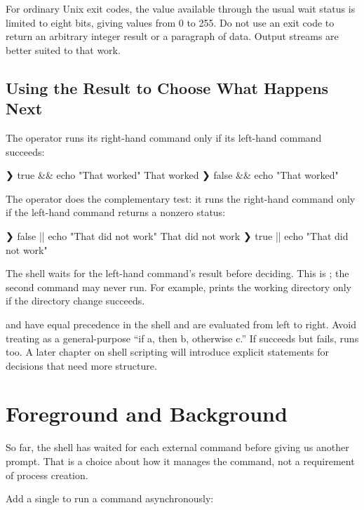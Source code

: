 \documentclass[11pt]{article}
\begin{document}
For ordinary Unix exit codes, the value available through the usual wait status is limited to eight bits, giving values from 0 to 255.
Do not use an exit code to return an arbitrary integer result or a paragraph of data.
Output streams are better suited to that work.

\subsection{Using the Result to Choose What Happens Next}

The \inlinesh{&&} operator runs its right-hand command only if its left-hand command succeeds:

\begin{terminal}[unbreakable]
❯ true && echo "That worked"
That worked
❯ false && echo "That worked"
\end{terminal}

The \inlinesh{||} operator does the complementary test: it runs the right-hand command only if the left-hand command returns a nonzero status:

\begin{terminal}[unbreakable]
❯ false || echo "That did not work"
That did not work
❯ true || echo "That did not work"
\end{terminal}

The shell waits for the left-hand command's result before deciding.
This is ; the second command may never run.
For example,  prints the working directory only if the directory change succeeds.

\inlinesh{&&} and \inlinesh{||} have equal precedence in the shell and are evaluated from left to right.
Avoid treating  as a general-purpose ``if a, then b, otherwise c.''
If  succeeds but  fails,  runs too.
A later chapter on shell scripting will introduce explicit  statements for decisions that need more structure.

\section{Foreground and Background}

So far, the shell has waited for each external command before giving us another prompt.
That is a choice about how it manages the command, not a requirement of process creation.

Add a single \inlinesh{&} to run a command asynchronously:
\end{document}
